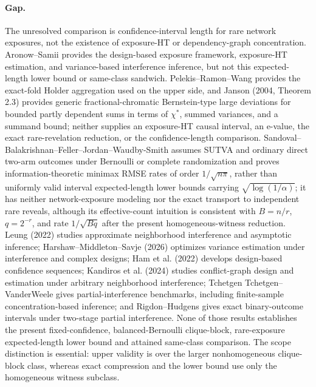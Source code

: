 \documentclass{article}
\begin{document}
\paragraph{Gap.} The unresolved comparison is confidence-interval length for rare network exposures, not the existence of exposure-HT or dependency-graph concentration. Aronow--Samii provides the design-based exposure framework, exposure-HT estimation, and variance-based interference inference, but not this expected-length lower bound or same-class sandwich. Pelekis--Ramon--Wang provides the exact-fold Holder aggregation used on the upper side, and Janson (2004, Theorem 2.3) provides generic fractional-chromatic Bernstein-type large deviations for bounded partly dependent sums in terms of \(\chi^*\), summed variances, and a summand bound; neither supplies an exposure-HT causal interval, an e-value, the exact rare-revelation reduction, or the confidence-length comparison. Sandoval--Balakrishnan--Feller--Jordan--Waudby-Smith assumes SUTVA and ordinary direct two-arm outcomes under Bernoulli or complete randomization and proves information-theoretic minimax RMSE rates of order \(1/\sqrt{n\pi}\), rather than uniformly valid interval expected-length lower bounds carrying \(\sqrt{\log(1/\alpha)}\); it has neither network-exposure modeling nor the exact transport to independent rare reveals, although its effective-count intuition is consistent with \(B=n/r\), \(q=2^{-r}\), and rate \(1/\sqrt{Bq}\) after the present homogeneous-witness reduction. Leung (2022) studies approximate neighborhood interference and asymptotic inference; Harshaw--Middleton--Savje (2026) optimizes variance estimation under interference and complex designs; Ham et al. (2022) develops design-based confidence sequences; Kandiros et al. (2024) studies conflict-graph design and estimation under arbitrary neighborhood interference; Tchetgen Tchetgen--VanderWeele gives partial-interference benchmarks, including finite-sample concentration-based inference; and Rigdon--Hudgens gives exact binary-outcome intervals under two-stage partial interference. None of those results establishes the present fixed-confidence, balanced-Bernoulli clique-block, rare-exposure expected-length lower bound and attained same-class comparison. The scope distinction is essential: upper validity is over the larger nonhomogeneous clique-block class, whereas exact compression and the lower bound use only the homogeneous witness subclass.
\end{document}
